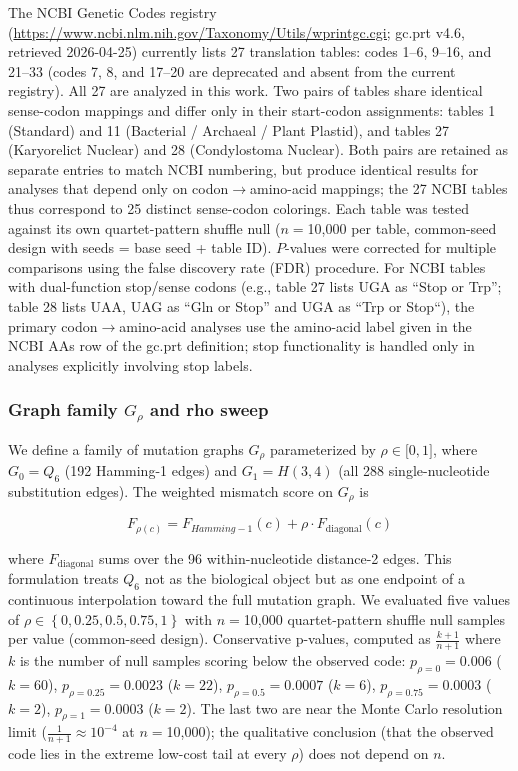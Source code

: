 \documentclass[preprint,11pt,authoryear,a4paper]{elsarticle}
\begin{document}
The NCBI Genetic Codes registry
(\url{https://www.ncbi.nlm.nih.gov/Taxonomy/Utils/wprintgc.cgi;} gc.prt
v4.6, retrieved 2026-04-25) currently lists 27 translation tables: codes
1--6, 9--16, and 21--33 (codes 7, 8, and 17--20 are deprecated and
absent from the current registry). All 27 are analyzed in this work. Two
pairs of tables share identical sense-codon mappings and differ only in
their start-codon assignments: tables 1 (Standard) and 11 (Bacterial /
Archaeal / Plant Plastid), and tables 27 (Karyorelict Nuclear) and 28
(Condylostoma Nuclear). Both pairs are retained as separate entries to
match NCBI numbering, but produce identical results for analyses that
depend only on codon\(\rightarrow\)amino-acid mappings; the 27 NCBI
tables thus correspond to 25 distinct sense-codon colorings. Each table
was tested against its own quartet-pattern shuffle null (\(n =\)10,000
per table, common-seed design with seeds = base seed + table ID).
\(P\)-values were corrected for multiple comparisons using the
\citep{benjamini1995} false discovery rate (FDR) procedure. For NCBI
tables with dual-function stop/sense codons (e.g., table 27 lists UGA as
``Stop or Trp''; table 28 lists UAA, UAG as ``Gln or Stop'' and UGA as
``Trp or Stop``), the primary codon\(\rightarrow\)amino-acid analyses
use the amino-acid label given in the NCBI AAs row of the gc.prt
definition; stop functionality is handled only in analyses explicitly
involving stop labels.

\subsubsection{\texorpdfstring{Graph family \(G_{\rho}\) and rho
sweep}{Graph family G\_\{\textbackslash rho\} and rho sweep}}\label{sec:null-rho}

We define a family of mutation graphs \(G_{\rho}\) parameterized by
\(\rho \in \lbrack 0,1\rbrack\), where \(G_{0} = Q_{6}\) (192 Hamming-1
edges) and \(G_{1} = H(3,4)\) (all 288 single-nucleotide substitution
edges). The weighted mismatch score on \(G_{\rho}\) is

\[F_{\rho(c)} = F_{Hamming-1}(c) + \rho \cdot F_{\text{diagonal}}(c)\]
\protect{}\label{eq:weighted}{}

where \(F_{\text{diagonal}}\) sums over the 96 within-nucleotide
distance-2 edges. This formulation treats \(Q_{6}\) not as the
biological object but as one endpoint of a continuous interpolation
toward the full mutation graph. We evaluated five values of
\(\rho \in \left\{ 0,0.25,0.5,0.75,1 \right\}\) with \(n =\)10,000
quartet-pattern shuffle null samples per value (common-seed design).
Conservative p-values, computed as \(\frac{k + 1}{n + 1}\) where \(k\)
is the number of null samples scoring below the observed code:
\(p_{\rho = 0} = 0.006\) (\(k = 60\)), \(p_{\rho = 0.25} = 0.0023\)
(\(k = 22\)), \(p_{\rho = 0.5} = 0.0007\) (\(k = 6\)),
\(p_{\rho = 0.75} = 0.0003\) (\(k = 2\)), \(p_{\rho = 1} = 0.0003\)
(\(k = 2\)). The last two are near the Monte Carlo resolution limit
(\(\frac{1}{n + 1} \approx 10^{- 4}\) at \(n =\)10,000); the qualitative
conclusion (that the observed code lies in the extreme low-cost tail at
every \(\rho\)) does not depend on \(n\).
\end{document}
